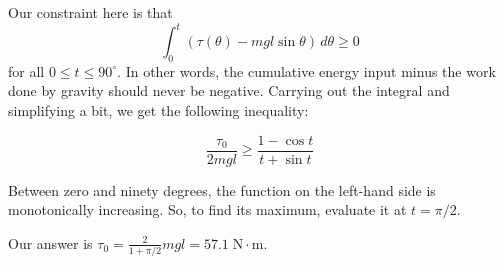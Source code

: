 \begin{solution}
    Our constraint here is that 
    $$\int_{0}^{t} (\tau (\theta)-mgl\sin \theta) \, d\theta \geq 0$$
    for all $0\leq t \leq 90^{\circ}$. In other words, the cumulative energy input minus the work done by gravity should never be negative. Carrying out the integral and simplifying a bit, we get the following inequality:
    
    $$\frac{\tau_0}{2mgl}\geq\frac{1-\cos t}{t+\sin t}$$

    Between zero and ninety degrees, the function on the left-hand side is monotonically increasing. So, to find its maximum, evaluate it at $t=\pi/2$.

    Our answer is $\boxed{\tau_0=\frac{2}{1+\pi/2} mgl = 57.1\;\mathrm{N\cdot m}}$.
\end{solution}
